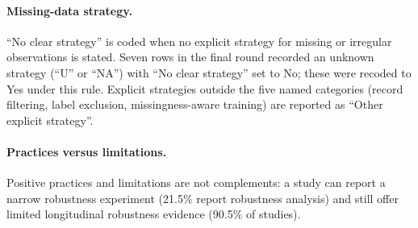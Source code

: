 \documentclass[11pt]{article}
\theoremstyle{plain}
\theoremstyle{definition}
\theoremstyle{remark}
\begin{document}
\paragraph{Missing-data strategy.} ``No clear strategy'' is coded when no explicit strategy for missing or irregular observations is stated. Seven rows in the final round recorded an unknown strategy (``U'' or ``NA'') with ``No clear strategy'' set to No; these were recoded to Yes under this rule. Explicit strategies outside the five named categories (record filtering, label exclusion, missingness-aware training) are reported as ``Other explicit strategy''.

\paragraph{Practices versus limitations.} Positive practices and limitations are not complements: a study can report a narrow robustness experiment (21.5\% report robustness analysis) and still offer limited longitudinal robustness evidence (90.5\% of  studies).
\end{document}
